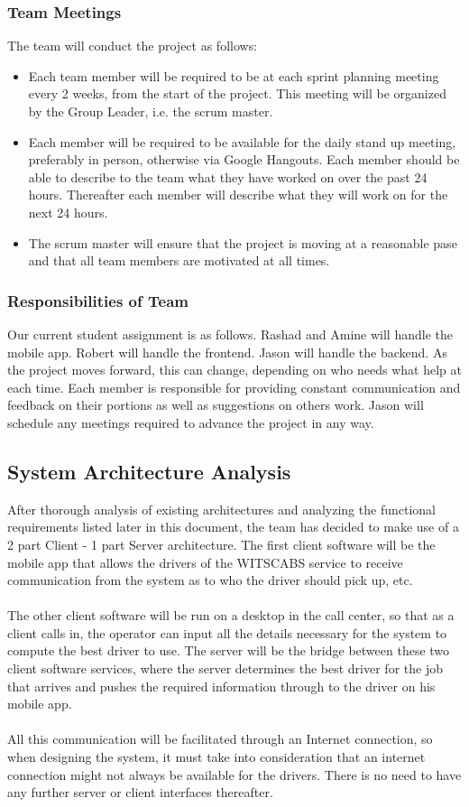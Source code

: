 \documentclass[a4paper,12pt]{article}
\begin{document}
\subsubsection{Team Meetings}
The team will conduct the project as follows:
\begin{itemize}
\setlength\itemsep{0em}
\item [] Each team member will be required to be at each sprint planning meeting every 2 weeks, from the start of the project. This meeting will be organized by the Group Leader, i.e. the scrum master.
\item [] Each member will be required to be available for the daily stand up meeting, preferably in person, otherwise via Google Hangouts. Each member should be able to describe to the team what they have worked on over the past 24 hours. Thereafter each member will describe what they will work on for the next 24 hours. 
\item [] The scrum master will ensure that the project is moving at a reasonable pase and that all team members are motivated at all times.
\end{itemize}
\subsubsection{Responsibilities of Team}
Our current student assignment is as follows. Rashad and Amine will handle the mobile app. Robert will handle the frontend. Jason will handle the backend. As the project moves forward, this can change, depending on who needs what help at each time. Each member is responsible for providing constant communication and feedback on their portions as well as suggestions on others work. Jason will schedule any meetings required to advance the project in any way.
\newpage
\subsection{System Architecture Analysis}
After thorough analysis of existing architectures and analyzing the functional requirements listed later in this document, the team has decided to make use of a 2 part Client - 1 part Server architecture. The first client software will be the mobile app that allows the drivers of the WITSCABS service to receive communication from the system as to who the driver should pick up, etc. \\\\The other client software will be run on a desktop in the call center, so that as a client calls in, the operator can input all the details necessary for the system to compute the best driver to use. The server will be the bridge between these two client software services, where the server determines the best driver for the job that arrives and pushes the required information through to the driver on his mobile app.\\\\ All this communication will be facilitated through an Internet connection, so when designing the system, it must take into consideration that an internet connection might not always be available for the drivers. There is no need to have any further server or client interfaces thereafter.
\newpage
\end{document}
